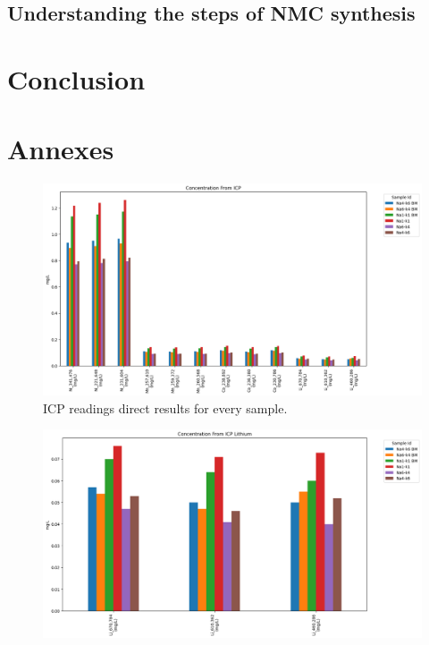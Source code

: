 \documentclass{article}
\begin{document}
{\begin{itemize}
\begin{figure}[H]
    \label{fig:SEM_Distributions}
\end{figure}

\subsection{Understanding the steps of NMC synthesis}


\section{Conclusion}


  


\section{Annexes} 
\begin{figure}[H]
  \centering
  \includegraphics[width=\textwidth]{output.png}
  \caption{ICP readings direct results for every sample.}
  \label{fig:example_image}
\end{figure}
\begin{figure}[H]
  \centering
  \includegraphics[width=\textwidth]{output3.png}

\end{figure}
\end{itemize}}
\end{document}
